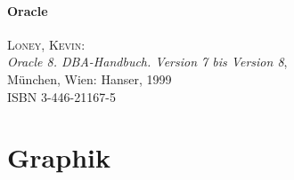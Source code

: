 \paragraph{Oracle}

\begin{description}
  
\item \textsc{Loney, Kevin}: \\
  \textit{Oracle 8. DBA-Handbuch. Version 7 bis Version 8}, \\
  M\"unchen, Wien: Hanser, 1999 \\
  ISBN 3-446-21167-5

\end{description} 

\section{Graphik}

